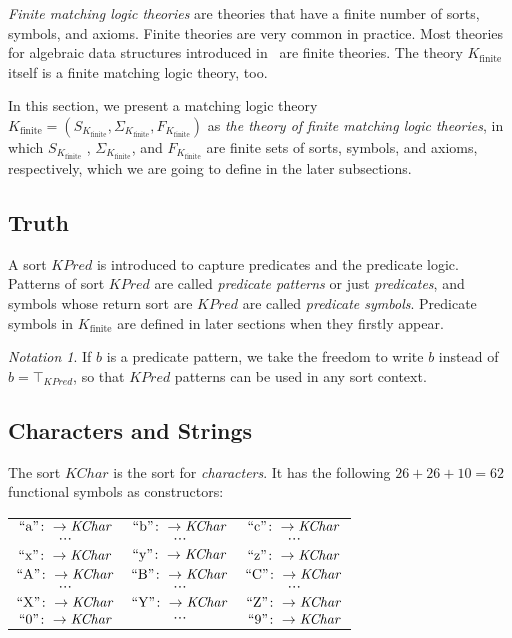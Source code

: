 \documentclass[UTF8,11pt]{article}
\newcounter{thmcounter}
\theoremstyle{plain}
\theoremstyle{definition}
\theoremstyle{remark}
\newtheorem{notation}   [thmcounter]{Notation}
\newcommand{\Kfinite}{{K_\text{finite}}}
\newcommand{\KPred}{\mathit{KPred}}
\newcommand{\KChar}{\mathit{KChar}}
\newcommand{\quot}[1]{\mathrm{``#1"}}
\begin{document}
\emph{Finite matching logic theories} are theories that have a finite number of sorts, symbols, and axioms.
Finite theories are very common in practice.
Most theories for algebraic data structures introduced in~\cite{rosu-2017-lmcs} are finite theories. 
The theory $\Kfinite$ itself is a finite matching logic theory, too.

In this section, we present a matching logic theory $\Kfinite = ( S_\Kfinite, \Sigma_\Kfinite, F_\Kfinite )$ as \emph{the theory of finite matching logic theories}, in which $S_\Kfinite$ , $\Sigma_\Kfinite$, and $F_\Kfinite$ are finite sets of sorts, symbols, and axioms, respectively, which we are going to define in the later subsections.

\subsection{Truth}

A sort $\KPred$ is introduced to capture predicates and the predicate logic.
Patterns of sort $\KPred$ are called \emph{predicate patterns} or just \emph{predicates}, and symbols whose return sort are $\KPred$ are called \emph{predicate symbols}. 
Predicate symbols in $\Kfinite$ are defined in later sections when they firstly appear.
\begin{notation}
	If $b$ is a predicate pattern, we take the freedom to write $b$ instead of $b = \top_\KPred$, so that $\KPred$ patterns can be used in any sort context.
\end{notation}

\subsection{Characters and Strings}
\label{sec:chars-string}
The sort $\KChar$ is the sort for \emph{characters}. It has the following $26 + 26 + 10 = 62$ functional symbols as constructors:
\begin{center}
	\begin{tabular}{c c c}
		$\quot{a} \colon \to \KChar$ & $\quot{b} \colon \to \KChar$ & $\quot{c} \colon \to \KChar$ \\
		$\cdots$ & $\cdots$ & $\cdots$ \\
		$\quot{x} \colon \to \KChar$ & $\quot{y} \colon \to \KChar$ & $\quot{z} \colon \to \KChar$ \\
		$\quot{A} \colon \to \KChar$ & $\quot{B} \colon \to \KChar$ & $\quot{C} \colon \to \KChar$ \\
		$\cdots$ & $\cdots$ & $\cdots$ \\
		$\quot{X} \colon \to \KChar$ & $\quot{Y} \colon \to \KChar$ & $\quot{Z} \colon \to \KChar$ \\
		$\quot{0} \colon \to \KChar$ & $\cdots$ & $\quot{9} \colon \to \KChar$ 
	\end{tabular}
\end{center}
\end{document}

